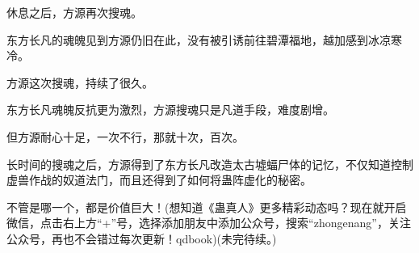 \begin{this_body}
休息之后，方源再次搜魂。

东方长凡的魂魄见到方源仍旧在此，没有被引诱前往碧潭福地，越加感到冰凉寒冷。

方源这次搜魂，持续了很久。

东方长凡魂魄反抗更为激烈，方源搜魂只是凡道手段，难度剧增。

但方源耐心十足，一次不行，那就十次，百次。

长时间的搜魂之后，方源得到了东方长凡改造太古墟蝠尸体的记忆，不仅知道控制虚兽作战的奴道法门，而且还得到了如何将蛊阵虚化的秘密。

不管是哪一个，都是价值巨大！(想知道《蛊真人》更多精彩动态吗？现在就开启微信，点击右上方“+”号，选择添加朋友中添加公众号，搜索“zhongenang”，关注公众号，再也不会错过每次更新！qdbook)(未完待续。)

\end{this_body}

